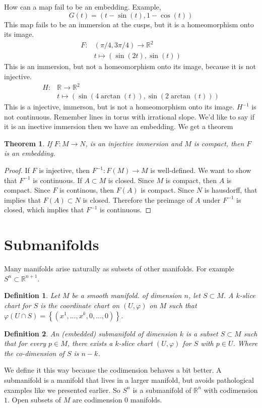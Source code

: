 \documentclass[a4paper]{article}
\newtheorem*{defn}{Definition}
\newtheorem*{thm}{Theorem}
\begin{document}
How can a map fail to be an embedding. Example, 
\[
  G(t) = (t - \sin(t), 1 - \cos(t))
\]
This map fails to be an immersion at the cusps, but it is a homeomorphism onto its image.
\[
  \begin{aligned}
    F: &(\pi/4, 3\pi/4) \rightarrow \mathds{R}^2 \\
     &t \mapsto (\sin(2t), \sin(t))
  \end{aligned}
\]
This is an immersion, but not a homeomorphism onto its image, because it is not injective.
\[
  \begin{aligned}
    H: &\mathds{R} \rightarrow \mathds{R}^2 \\
     &t \mapsto (\sin(4 \arctan(t)), \sin(2 \arctan(t))) 
  \end{aligned}
\]
This is a injective, immerson, but is not a homeomorphism onto its image. $H^{-1}$ is not continuous. Remember lines in torus with irrational slope. We'd like to say if it is an inective immersion then we have an embedding. We get a theorem
\begin{thm}
  If $F: M \rightarrow N$, is an injective immersion and $M$ is compact, then $F$ is an embedding.
\end{thm}

\begin{proof}
  If $F$ is injective, then $F^{-1}: F(M) \rightarrow M$ is well-defined. We want to show that $F^{-1}$ is continuous. If $A \subset M$ is closed. Since $M$ is compact, then $A$ is compact. Since $F$ is continous, then $F(A)$ is compact. Since $N$ is hausdorff, that implies that $F(A) \subset N$ is closed. Therefore the preimage of $A$ under $F^{-1}$ is closed, which implies that $F^{-1}$ is continuous.
\end{proof}

\section*{Submanifolds}%
Many manifolds arise naturally as subsets of other manifolds. For example $S^n \subset \mathds{R}^{n+1}$.

\begin{defn}
  Let $M$ be a smooth manifold. of dimension $n$, let $S \subset M$. A $k$-slice chart for $S$ is the coordinate chart on $(U, \varphi)$ on $M$ such that $\varphi(U \cap S) = \left\{(x^1, \dots, x^k, 0, \dots, 0)\right\}$.
\end{defn}
 \begin{defn}
   An (embedded) submanifold of dimension $k$ is a subset $S \subset M$ such that for every $p \in M$, there exists a $k$-slice chart $(U, \varphi)$ for $S$ with $p \in U$. Where the co-dimension of $S$ is $n-k$.
 \end{defn}
 We define it this way because the codimension behaves a bit better. A submanifold is a manifold that lives in a larger manifold, but avoids pathological examples like we presented earlier. So $S^n$ is a submanifold of $\mathds{R}^n$ with codimension $1$. Open subsets of $M$ are codimension $0$ manifolds.
\end{document}
